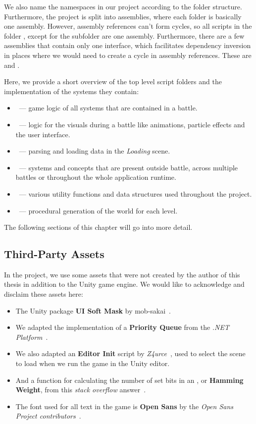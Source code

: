 We also name the namespaces in our project according to the folder structure.
Furthermore, the project is split into assemblies, where each folder is basically one assembly.
However, assembly references can't form cycles, so all scripts in the folder , except for the subfolder  are one assembly.
Furthermore, there are a few assemblies that contain only one interface, which facilitates dependency inversion in places where we would need to create a cycle in assembly references.
These are  and .

Here, we provide a short overview of the top level script folders and the implementation of the systems they contain:
\begin{itemize}
    \item {}~--- game logic of all systems that are contained in a battle.
    \item {}~--- logic for the visuals during a battle like animations, particle effects and the user interface.
    \item {}~--- parsing and loading data in the \emph{Loading} scene.
    \item {}~--- systems and concepts that are present outside battle, across multiple battles or throughout the whole application runtime.
    \item {}~--- various utility functions and data structures used throughout the project.
    \item {}~--- procedural generation of the world for each level.
\end{itemize}
The following sections of this chapter will go into more detail.

\subsection{Third-Party Assets}
In the project, we use some assets that were not created by the author of this thesis in addition to the Unity game engine.
We would like to acknowledge and disclaim these assets here:
\begin{itemize}
    \item The Unity package \textbf{UI Soft Mask} by mob-sakai~\cite{SoftMask}.
    \item We adapted the implementation of a \textbf{Priority Queue} from the \emph{.NET Platform}~\cite{PriorityQueue}.
    \item We also adapted an \textbf{Editor Init} script by \emph{Z4urce}~\cite{EditorInit}, used to select the scene to load when we run the game in the Unity editor.
    \item And a function for calculating the number of set bits in an , or \textbf{Hamming Weight}, from this \emph{stack overflow} answer~\cite{PopCount}.
    \item The font used for all text in the game is \textbf{Open Sans} by the \emph{Open Sans Project contributors}~\cite{OpenSans}.
\end{itemize}

